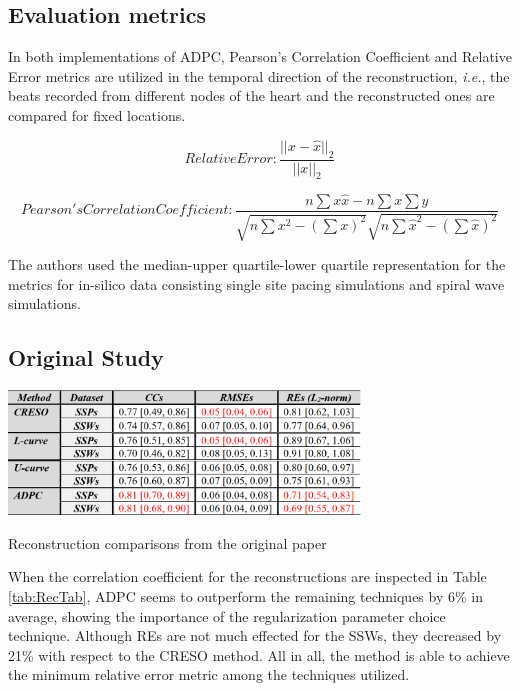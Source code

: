 \documentclass[draftcls, onecolumn, journal]{IEEEtran}
\begin{document}
\subsection{Evaluation metrics}

In both implementations of ADPC, Pearson's Correlation Coefficient and Relative Error metrics are utilized in the temporal direction of the reconstruction, \textit{i.e.}, the beats recorded from different nodes of the heart and the reconstructed ones are compared for fixed locations. 

\begin{equation}
    Relative Error: \frac{||x-\hat{x}||_2}{||x||_2}
\end{equation}

\begin{equation}
    Pearson's Correlation Coefficient: \frac{n\sum x \hat{x} - n \sum x \sum y}{\sqrt{n\sum x^2 - (\sum x)^2}\sqrt{n\sum {\hat{x}}^2 - (\sum \hat{x})^2}}
\end{equation}

The authors used the median-upper quartile-lower quartile representation for the metrics for in-silico data consisting single site pacing simulations and spiral wave simulations. 

\newpage

\subsection{Original Study}

\begin{table}[h]
\centering
\includegraphics[width=0.7\textwidth]{../images/RecTable.png}
\caption{\label{tab:RecTab}Reconstruction comparisons from the original paper}
\end{table}

When the correlation coefficient for the reconstructions are inspected in Table \ref{tab:RecTab}, ADPC seems to outperform the remaining techniques by 6\% in average, showing the importance of the regularization parameter choice technique. Although REs are not much effected for the SSWs, they decreased by 21\% with respect to the CRESO method. All in all, the method is able to achieve the minimum relative error metric among the techniques utilized.
\end{document}
